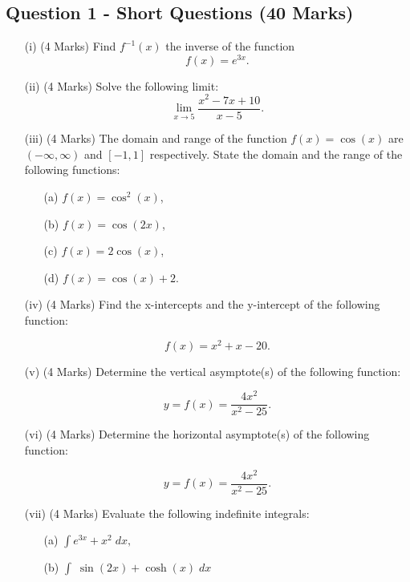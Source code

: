 ﻿ \documentclass[a4paper,12pt]{article}
\begin{document}
\subsection*{Question 1 - Short Questions (40 Marks)}

\begin{itemize}
	
	\item[(i)](4 Marks) Find $f^{-1}(x)$ the inverse of the function
	\[f(x) = e^{3x}. \]
		\smallskip
	\item[(ii)](4 Marks)	Solve the following limit:
	\[\lim_{x \to 5 } \frac{x^2- 7x +10}{x-5}.\]
	\smallskip
	\item[(iii)] (4 Marks) The domain and range of the function $f(x) = \cos(x)$ are $(-\infty, \infty)$ and $[-1,1]$ respectively. State the domain and the range of the following functions:
	\begin{multicols}{2}
		\begin{itemize}
		
		
	\item[(a)] $f(x) = \cos^2(x)  $,
		\item[(b)] $f(x) = \cos(2x)  $,
	\item[(c)] $f(x) = 2\cos(x)  $,
		\item[(d)] $f(x) = \cos(x) +2$.
	\end{itemize}
	\end{multicols}
	\smallskip

	
	\item[(iv)] (4 Marks) Find the x-intercepts and the y-intercept of the following function:
	
	\[ f(x) = x^2 + x - 20 . \]
	
	\smallskip
	\item[(v)] (4 Marks) Determine the vertical asymptote(s) of the following function:
	
	
	\[ y = f(x) = \frac{4x^2}{x^2-25}. \]	
	\smallskip
	\item[(vi)] (4 Marks) Determine the horizontal asymptote(s) of the following function:
	
	\[ y = f(x) = \frac{4x^2}{x^2-25}.\]
		
	\smallskip
	\newpage
	\item[(vii)] (4 Marks) Evaluate the following indefinite integrals:
	\begin{multicols}{2}
	\begin{itemize}
		\item[(a)] $\displaystyle{ \int  e^{3x} + x^2\; dx, }  $
		\item[(b)] $\displaystyle{ \int \;\sin(2x)+ \cosh(x)\; dx}$
		

\end{itemize}
\end{multicols}
\end{itemize}
\end{document}
